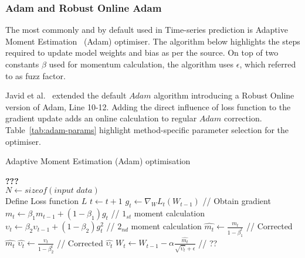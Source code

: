 \subsubsection{Adam and Robust Online Adam}
The most commonly and by default used in Time-series prediction is Adaptive Moment Estimation~\cite{kingma_adam_2017} (Adam) optimiser.
The algorithm below highlights the steps required to update model weights and bias as per the source.
On top of two constants $\beta$ used for momentum calculation, the algorithm uses $\epsilon$, which referred to as fuzz factor.

%
%
Javid et al.~\cite{javid_adaptive_2020} extended the default $Adam$ algorithm introducing a Robust Online version of Adam, Line 10-12.
Adding the direct influence of loss function to the gradient update adds an online calculation to regular $Adam$ correction.
Table~\ref{tab:adam-params} highlight method-specific parameter selection for the optimiser.
\begin{algorithm}
  \caption{Adaptive Moment Estimation (Adam) optimisation}
  \begin{algorithmic}[1]
    \STATE \textbf{???} \\ $N\gets sizeof(\textit{input data})$\\
    \STATE Define Loss function $L$
    \STATE $t \gets t+1$
    \STATE $g_t \gets \nabla_W L_t (W_{t-1})$ // Obtain gradient
    \STATE $m_t \gets \beta_1 m_{t-1}+(1-\beta_1) g_t $ // $1_{st}$ moment calculation
    \STATE $\upsilon_t \gets \beta_2 \upsilon_{t-1}+ \left(1-\beta_2 \right)g^2_t $ // $2_{nd}$ moment calculation \label{alg:Adam-Line-2Moment}
    \STATE $\hat{m_t} \gets \frac{m_t}{1-\beta^t_1}$ // Corrected $\hat{m_t}$
    \STATE $\hat{\upsilon_t} \gets \frac{\upsilon_t}{1-\beta^t_2} $ // Corrected $\hat{\upsilon_t}$
    \STATE $W_t \gets W_{t-1}- \alpha \frac{\hat{m_t}}{\sqrt{\hat{\upsilon_t}}+\epsilon} $ // ??
    \ENDWHILE
  \end{algorithmic}
  \label{alg:Adam}
\end{algorithm}
